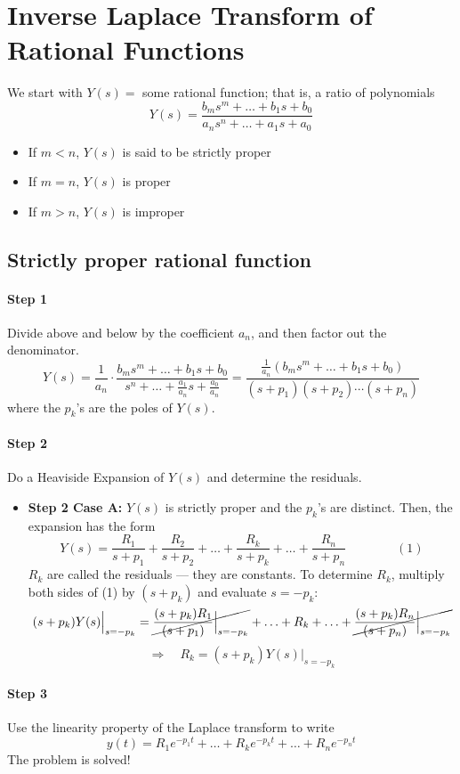 \documentclass{book}
\begin{document}
\section*{Inverse Laplace Transform of Rational Functions}
We start with $ Y(s) =$ some rational function; that is, a ratio of polynomials
\[ Y(s)=\frac{b_ms^m+\ldots+b_1s+b_0}{a_ns^n+\ldots+a_1s+a_0} \]
\begin{itemize}
	\item If $ m<n $, $ Y(s) $ is said to be strictly proper
	\item If $ m=n $, $ Y(s) $ is proper
	\item If $ m>n $, $ Y(s) $ is improper
\end{itemize}

\subsection*{Strictly proper rational function}
\paragraph*{Step 1} Divide above and below by the coefficient $ a_n $, and then factor out the denominator.
\[ Y(s) = \frac{1}{a_n}\cdot\frac{b_ms^m+\ldots+b_1s+b_0}{s^n+\ldots+\frac{a_1}{a_n}s+\frac{a_0}{a_n}} = \frac{\frac{1}{a_n}(b_ms^m+\ldots+b_1s+b_0)}{(s+p_1)(s+p_2)\cdots(s+p_n)} \]
where the $ p_k $'s are the poles of $ Y(s) $.
\paragraph*{Step 2} Do a Heaviside Expansion of $ Y(s) $ and determine the residuals.
\begin{itemize}
	\item \textbf{Step 2 Case A:} $ Y(s) $ is strictly proper and the $ p_k $'s are distinct. Then, the expansion has the form
	\[ Y(s) = \frac{R_1}{s+p_1}+\frac{R_2}{s+p_2}+\ldots+\frac{R_k}{s+p_k}+\ldots+\frac{R_n}{s+p_n} \qquad \qquad (1) \]
	$ R_k $ are called the residuals --- they are constants. To determine $ R_k $, multiply both sides of (1) by $ (s+p_k) $ and evaluate $ s=-p_k $:
	\[ (s+p_k)Y(s)\Big|_{s=-p_k} = \cancel{\frac{(s+p_k)R_1}{(s+p_1)}\Big|_{s=-p_k}}+\ldots+R_k+\ldots+\cancel{\frac{(s+p_k)R_n}{(s+p_n)}\Big|_{s=-p_k}} \]
	\[\Rightarrow\quad R_k = (s+p_k)Y(s)\Big|_{s=-p_k} \]
\end{itemize}
\paragraph*{Step 3} Use the linearity property of the Laplace transform to write
\[ y(t) = R_1e^{-p_1t}+\ldots+R_ke^{-p_kt}+\ldots+R_ne^{-p_nt} \]
The problem is solved!
\end{document}
